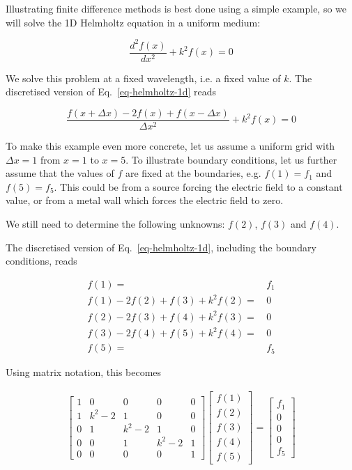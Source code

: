 \pagebreak



Illustrating finite difference methods is best done using a simple example, so we will solve the 1D Helmholtz equation in a uniform medium:

\begin{equation}
\frac{d^2 f(x)}{d x^2} + k^2 f(x) = 0 \label{eq-helmholtz-1d}
\end{equation} 

We solve this problem at a fixed wavelength, i.e. a fixed value of $k$. The discretised version of Eq.~\ref{eq-helmholtz-1d} reads

\begin{equation}
\frac{f(x + \Delta x) -2 f(x) + f(x- \Delta x)}{ \Delta x^2} + k^2 f(x) = 0 \label{eq-hh-diff}
\end{equation}  
 
To make this example even more concrete, let us assume a uniform grid with $\Delta x=1$ from $x=1$ to $x=5$. To illustrate boundary conditions, let us further assume that the values of $f$ are fixed at the boundaries, e.g. $f(1)=f_1$ and $f(5)=f_5$. This could be from a source forcing the electric field to a constant value, or from a metal wall which forces the electric field to zero. 

We still need to determine the following unknowns: $f(2)$, $f(3)$ and $f(4)$.

The discretised version of Eq.~\ref{eq-helmholtz-1d}, including the boundary conditions, reads

\begin{align}
f(1)=& \, f_1 \\
f(1) -2f(2) + f(3) + k^2 f(2) =& \, 0 \\
f(2) -2f(3) + f(4) + k^2 f(3) =& \, 0\\
f(3) -2f(4) + f(5) + k^2 f(4) =& \, 0\\
f(5)=& \, f_5
\end{align} 

Using matrix notation, this becomes

\begin{gather}
\begin{bmatrix}
1& 0& 0& 0& 0 \\
1& k^2-2& 1& 0& 0 \\
0& 1& k^2-2& 1& 0  \\
0& 0& 1& k^2-2& 1  \\
0& 0& 0& 0& 1
\end{bmatrix}
\begin{bmatrix}
f(1) \\
f(2) \\
f(3) \\
f(4) \\
f(5)
\end{bmatrix}
= 
\begin{bmatrix}
f_1 \\
0 \\
0 \\
0 \\
f_5
\end{bmatrix} \label{eq-ex-fd}
\end{gather}

